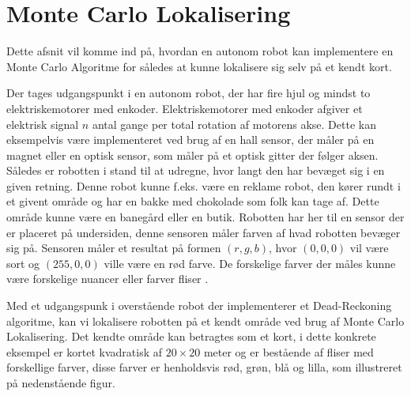 \documentclass[../../SRP.tex]{subfiles}
\begin{document}
\chapter{Monte Carlo Lokalisering}
Dette afsnit vil komme ind på, hvordan en autonom robot kan implementere en Monte Carlo Algoritme for således at kunne lokalisere sig selv på et kendt kort.  

 Der tages udgangspunkt i en autonom robot, der har fire hjul og mindst to elektriskemotorer med enkoder. Elektriskemotorer med enkoder afgiver et elektrisk signal $n$ antal gange per total rotation af motorens akse. Dette kan eksempelvis være implementeret ved brug af en hall sensor, der måler på en magnet eller en optisk sensor, som måler på et optisk gitter der følger aksen. Således er robotten i stand til at udregne, hvor langt den har bevæget sig i en given retning. Denne robot kunne f.eks. være en reklame robot, den kører rundt i et givent område og har en bakke med chokolade som folk kan tage af. Dette område kunne være en banegård eller en butik. Robotten har her til en sensor der er placeret på undersiden, denne sensoren måler farven af hvad robotten bevæger sig på. Sensoren måler et resultat på formen $(r,g,b)$, hvor $(0,0,0)$ vil være sort og $(255,0,0)$ ville være en rød farve. De forskelige farver der måles kunne være forskelige nuancer eller farver fliser \cite{DR}.

Med et udgangspunk i overstående robot der implementerer et Dead-Reckoning algoritme, kan vi lokalisere robotten på et kendt område ved brug af Monte Carlo Lokalisering. Det kendte område kan betragtes som et kort, i dette konkrete eksempel er kortet kvadratisk af $20 \times 20$ meter og er bestående af fliser med forskellige farver, disse farver er henholdsvis rød, grøn, blå og lilla, som illustreret på nedenstående figur.


\begin{center}
\end{center}
\end{document}
